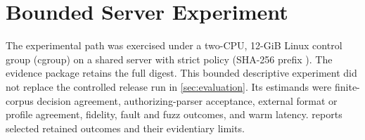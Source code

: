 \section{Bounded Server Experiment}
\label{sec:server-experiment}

The experimental path was exercised under a two-CPU, 12-GiB Linux control group
(cgroup) on a shared server with strict policy
\texttt{\AFDExperimentReleasePolicyVersion}
(SHA-256 prefix \AFDExperimentReleasePolicyHashShort). The evidence package
retains the full digest. This bounded descriptive experiment
did not replace the
controlled release run in \cref{sec:evaluation}. Its estimands were
finite-corpus decision agreement, authorizing-parser acceptance, external
format or profile agreement, fidelity, fault and fuzz outcomes, and warm latency.
 reports selected retained outcomes and
their evidentiary limits.

